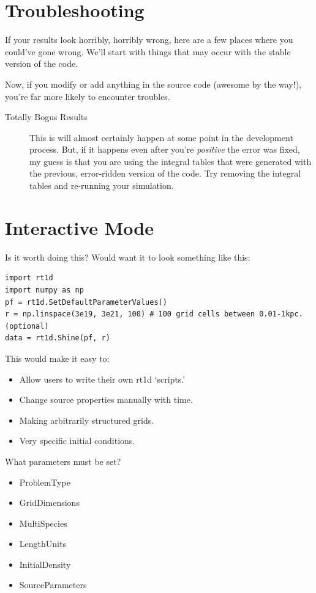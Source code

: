 \documentclass[letterpaper,titlepage,12pt]{article}
\numberwithin{equation}{section}
\begin{document}
\section{Troubleshooting}
If your results look horribly, horribly wrong, here are a few places where you could've gone wrong.  We'll start with things that may occur with the stable version of the code.


Now, if you modify or add anything in the source code (awesome by the way!), you're far more likely to encounter troubles.


\begin{description}
    \item[Totally Bogus Results] This is will almost certainly happen at some point in the development process. But, if it happens even after you're \textit{positive} the error was fixed, my guess is that you are using the integral tables that were generated with the previous, error-ridden version of the code.  Try removing the integral tables and re-running your simulation.
\end{description}

\section{Interactive Mode}
Is it worth doing this?  Would want it to look something like this:

\begin{verbatim}
import rt1d
import numpy as np
pf = rt1d.SetDefaultParameterValues()
r = np.linspace(3e19, 3e21, 100) # 100 grid cells between 0.01-1kpc. (optional)
data = rt1d.Shine(pf, r)    
\end{verbatim}    

This would make it easy to:
\begin{itemize}
    \item Allow users to write their own rt1d `scripts.'
    \item Change source properties manually with time.
    \item Making arbitrarily structured grids.
    \item Very specific initial conditions.
\end{itemize}    

What parameters must be set?
\begin{itemize}
    \item ProblemType
    \item GridDimensions
    \item MultiSpecies
    \item LengthUnits
    \item InitialDensity
    \item SourceParameters
\end{itemize}

\newpage


\end{document}
